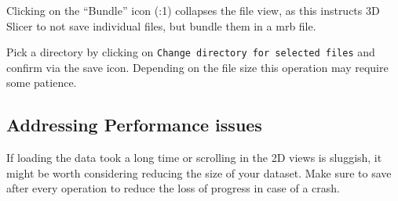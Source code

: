 Clicking on the ``Bundle'' icon (:1) collapses the file view, as this instructs 3D Slicer to not save individual files, but bundle them in a \Gls{mrb} file.

Pick a directory by clicking on \texttt{Change directory for selected files} and confirm via the save icon.
Depending on the file size this operation may require some patience.

\pagebreak

\subsection{Addressing Performance issues}\label{section:perf}
If loading the data took a long time or scrolling in the 2D views is sluggish, it might be worth considering reducing the size of your dataset.
Make sure to save after every operation to reduce the loss of progress in case of a crash.

